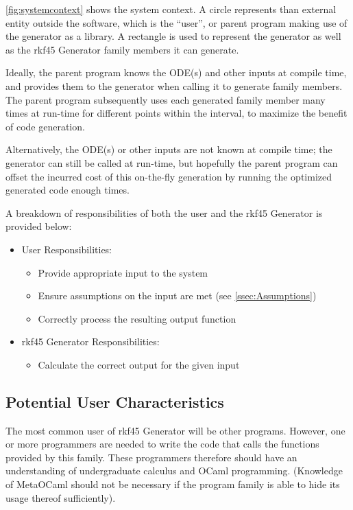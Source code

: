 \documentclass[12pt]{article}
\newcommand{\famname}{rkf45 Generator} %
\begin{document}
\autoref{fig:systemcontext} shows the system context. A circle represents than 
external entity outside the software, which is the ``user'', or parent program 
making use of the generator as a library. A rectangle is used to represent the 
generator as well as the \famname{} family members it can generate. 

Ideally, the parent program knows the ODE(s) and other inputs at compile time, 
and provides them to the generator when calling it to generate family members.
The parent program subsequently uses each generated family member many times at 
run-time for different points within the interval, to maximize the benefit of 
code generation.

Alternatively, the ODE(s) or other inputs are not known at compile time; the 
generator can still be called at run-time, but hopefully the parent program can 
offset the incurred cost of this on-the-fly generation by running the optimized 
generated code enough times.

A breakdown of responsibilities of both the user and the \famname{} is provided 
below:
\begin{itemize}
\item User Responsibilities:
\begin{itemize}
\item Provide appropriate input to the system
\item Ensure assumptions on the input are met (see \autoref{ssec:Assumptions})
\item Correctly process the resulting output function
\end{itemize}
\item \famname{} Responsibilities:
\begin{itemize}
\item Calculate the correct output for the given input
\end{itemize}
\end{itemize}

\subsection{Potential User Characteristics} \label{SecUserCharacteristics}

The most common user of \famname{} will be other programs. However, one or more 
programmers are needed to write the code that calls the functions provided by 
this family.
These programmers therefore should have an understanding of undergraduate 
calculus and OCaml programming. (Knowledge of MetaOCaml should not be necessary 
if the program family is able to hide its usage thereof sufficiently).
                                                                                
\end{document}
